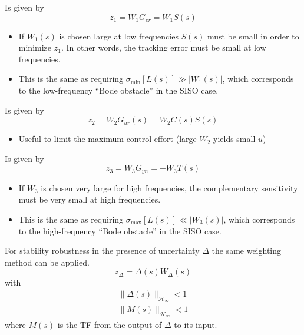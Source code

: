 \newpar{}

Is given by
\begin{equation*}
    z_1=W_1 G_{er} = W_1 S(s)
\end{equation*}
\begin{itemize}
    \item If $W_1(s)$ is chosen large at low frequencies $S(s)$ must be small in order to minimize $z_1$. In other words, the tracking error must be small at low frequencies.
    \item This is the same as requiring $\sigma_{\min}[L(s)] \gg |W_1(s)|$, which corresponds to the low-frequency ``Bode obstacle'' in the SISO case.
\end{itemize}

\newpar{}

Is given by
\begin{equation*}
    z_2=W_2 G_{ur}(s) = W_2 C(s) S(s)
\end{equation*}
\begin{itemize}
    \item Useful to limit the maximum control effort (large $W_2$ yields small $u$)
\end{itemize}

\newpar{}

Is given by
\begin{equation*}
    z_3= W_3 G_{yn} =-W_3 T(s)
\end{equation*}
\begin{itemize}
    \item If $W_3$ is chosen very large for high frequencies, the complementary sensitivity must be very small at high frequencies.
    \item This is the same as requiring $\sigma_{\max}[L(s)] \ll |W_3(s)|$, which corresponds to the high-frequency ``Bode obstacle'' in the SISO case.
\end{itemize}

\newpar{}

For stability robustness in the presence of uncertainty $\Delta$ the same weighting method can be applied.
\begin{equation*}
    z_\Delta = \Delta(s)W_\Delta(s)
\end{equation*}
with
\begin{gather*}
    \|\Delta(s)\|_{\mathcal{H}_\infty} < 1 \\
    \|M(s)\|_{\mathcal{H}_\infty} < 1
\end{gather*}
where $M(s)$ is the TF from the output of $\Delta$ to its input.

